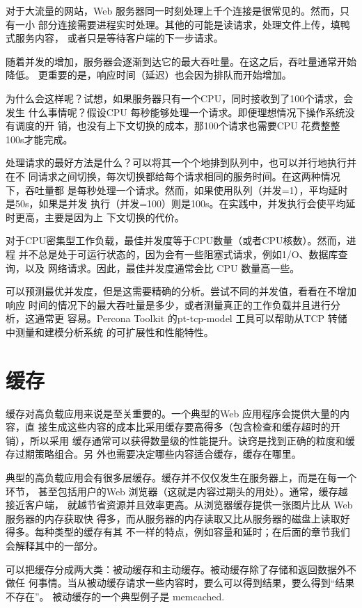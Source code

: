 对于大流量的网站，Web 服务器同一时刻处理上千个连接是很常见的。然而，只有一小
部分连接需要进程实时处理。其他的可能是读请求，处理文件上传，填鸭式服务内容，
或者只是等待客户端的下一步请求。

随着并发的增加，服务器会逐渐到达它的最大吞吐量。在这之后，吞吐量通常开始降低。
更重要的是，响应时间（延迟）也会因为排队而开始增加。

为什么会这样呢？试想，如果服务器只有一个CPU，同时接收到了100个请求，会发生
什么事情呢？假设CPU 每秒能够处理一个请求。即便理想情况下操作系统没有调度的开
销，也没有上下文切换的成本，那100个请求也需要CPU 花费整整100s才能完成。

处理请求的最好方法是什么？可以将其一个个地排到队列中，也可以并行地执行并在不
同请求之间切换，每次切换都给每个请求相同的服务时间。在这两种情况下，吞吐量都
是每秒处理一个请求。然而，如果使用队列（并发=1），平均延时是50s，如果是并发
执行（并发=100）则是100s。在实践中，并发执行会使平均延时更高，主要是因为上
下文切换的代价。

对于CPU密集型工作负载，最佳并发度等于CPU数量（或者CPU核数）。然而，进程
并不总是处于可运行状态的，因为会有一些阻塞式请求，例如1/O、数据库查询，以及
网络请求。因此，最佳并发度通常会比 CPU 数量高一些。

可以预测最优并发度，但是这需要精确的分析。尝试不同的并发值，看看在不增加响应
时间的情况下的最大吞吐量是多少，或者测量真正的工作负载并且进行分析，这通常更
容易。Percona Toolkit 的pt-tcp-model 工具可以帮助从TCP 转储中测量和建模分析系统
的可扩展性和性能特性。

\section{缓存}
缓存对高负载应用来说是至关重要的。一个典型的Web 应用程序会提供大量的内容，直
接生成这些内容的成本比采用缓存要高得多（包含检查和缓存超时的开销），所以采用
缓存通常可以获得数量级的性能提升。诀窍是找到正确的粒度和缓存过期策略组合。另
外也需要决定哪些内容适合缓存，缓存在哪里。

典型的高负载应用会有很多层缓存。缓存并不仅仅发生在服务器上，而是在每一个环节，
甚至包括用户的Web 浏览器（这就是内容过期头的用处）。通常，缓存越接近客户端，
就越节省资源并且效率更高。从浏览器缓存提供一张图片比从 Web 服务器的内存获取快
得多，而从服务器的内存读取又比从服务器的磁盘上读取好得多。每种类型的缓存有其
不一样的特点，例如容量和延时；在后面的章节我们会解释其中的一部分。

可以把缓存分成两大类：被动缓存和主动缓存。被动缓存除了存储和返回数据外不做任
何事情。当从被动缓存请求一些内容时，要么可以得到结果，要么得到“结果不存在”。
被动缓存的一个典型例子是 memcached.


